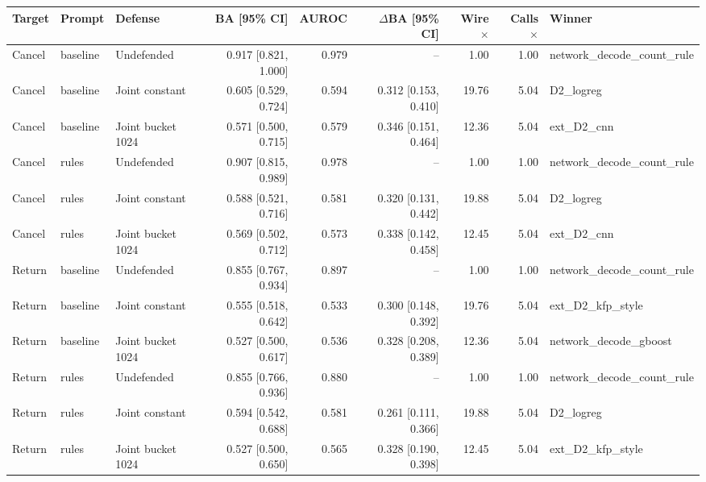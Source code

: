 \begin{tabular}{lllrrrrrl}
\toprule
Target & Prompt & Defense & BA [95\% CI] & AUROC & $\Delta$BA [95\% CI] & Wire $\times$ & Calls $\times$ & Winner \\
\midrule
Cancel & baseline & Undefended & 0.917 [0.821, 1.000] & 0.979 & -- & 1.00 & 1.00 & network\_decode\_count\_rule \\
Cancel & baseline & Joint constant & 0.605 [0.529, 0.724] & 0.594 & 0.312 [0.153, 0.410] & 19.76 & 5.04 & D2\_logreg \\
Cancel & baseline & Joint bucket 1024 & 0.571 [0.500, 0.715] & 0.579 & 0.346 [0.151, 0.464] & 12.36 & 5.04 & ext\_D2\_cnn \\
Cancel & rules & Undefended & 0.907 [0.815, 0.989] & 0.978 & -- & 1.00 & 1.00 & network\_decode\_count\_rule \\
Cancel & rules & Joint constant & 0.588 [0.521, 0.716] & 0.581 & 0.320 [0.131, 0.442] & 19.88 & 5.04 & D2\_logreg \\
Cancel & rules & Joint bucket 1024 & 0.569 [0.502, 0.712] & 0.573 & 0.338 [0.142, 0.458] & 12.45 & 5.04 & ext\_D2\_cnn \\
Return & baseline & Undefended & 0.855 [0.767, 0.934] & 0.897 & -- & 1.00 & 1.00 & network\_decode\_count\_rule \\
Return & baseline & Joint constant & 0.555 [0.518, 0.642] & 0.533 & 0.300 [0.148, 0.392] & 19.76 & 5.04 & ext\_D2\_kfp\_style \\
Return & baseline & Joint bucket 1024 & 0.527 [0.500, 0.617] & 0.536 & 0.328 [0.208, 0.389] & 12.36 & 5.04 & network\_decode\_gboost \\
Return & rules & Undefended & 0.855 [0.766, 0.936] & 0.880 & -- & 1.00 & 1.00 & network\_decode\_count\_rule \\
Return & rules & Joint constant & 0.594 [0.542, 0.688] & 0.581 & 0.261 [0.111, 0.366] & 19.88 & 5.04 & D2\_logreg \\
Return & rules & Joint bucket 1024 & 0.527 [0.500, 0.650] & 0.565 & 0.328 [0.190, 0.398] & 12.45 & 5.04 & ext\_D2\_kfp\_style \\
\bottomrule
\end{tabular}
